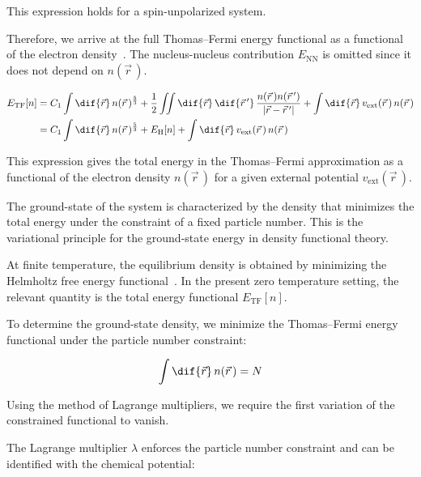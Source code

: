 This expression holds for a spin-unpolarized system.

Therefore, we arrive at the full Thomas--Fermi energy functional as a functional of the electron density~\cite{garcia2007efficient,xu2024recent}.
The nucleus-nucleus contribution $E_\mathrm{NN}$ is omitted since it does not depend on $n(\vec{r}\,)$.

\begin{equation}
\begin{aligned}
    E_\mathrm{TF}[n]
    &= C_1\int\dif{\vec{r}}\,n(\vec{r}\,)^{\frac{5}{3}}
    + \frac{1}{2}\iint\dif{\vec{r}}\,\dif{\vec{r}\,'}\,\frac{n(\vec{r}\,)n(\vec{r}\,')}{|\vec{r}-\vec{r}\,'|}
    + \int\dif{\vec{r}}\,v_\mathrm{ext}(\vec{r}\,)\,n(\vec{r}\,) \\
    &= C_1\int\dif{\vec{r}}\,n(\vec{r}\,)^{\frac{5}{3}}
    + E_\mathrm{H}[n] + \int\dif{\vec{r}}\,v_\mathrm{ext}(\vec{r}\,)\,n(\vec{r}\,)
\end{aligned}
\label{full_energy_functional}
\end{equation}

This expression gives the total energy in the Thomas--Fermi approximation as a functional of the electron density $n(\vec{r}\,)$ for a given external potential $v_\mathrm{ext}(\vec{r}\,)$.

The ground-state of the system is characterized by the density that minimizes the total energy under the constraint of a fixed particle number.
This is the variational principle for the ground-state energy in density functional theory.

At finite temperature, the equilibrium density is obtained by minimizing the Helmholtz free energy functional~\cite{mermin1965thermal}.
In the present zero temperature setting, the relevant quantity is the total energy functional $E_\mathrm{TF}[n]$.

To determine the ground-state density, we minimize the Thomas--Fermi energy functional under the particle number constraint:

\begin{equation}
    \int\dif{\vec{r}}\,n(\vec{r}\,)=N
\label{constraint_particle_number}
\end{equation}

Using the method of Lagrange multipliers, we require the first variation of the constrained functional to vanish.

The Lagrange multiplier $\lambda$ enforces the particle number constraint and can be identified with the chemical potential:


